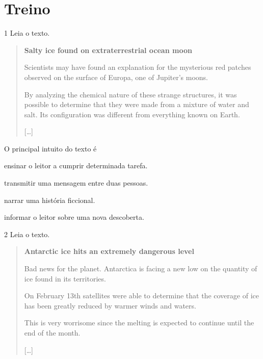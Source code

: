 
\section{Treino}

\num{1} Leia o texto.

\begin{quote}
\textbf{Salty ice found on extraterrestrial ocean moon}

Scientists may have found an explanation for the mysterious red patches observed on the surface of Europa, one of Jupiter’s moons.

By analyzing the chemical nature of these strange structures, it was possible to determine that they were made from a mixture of water and salt. Its configuration was different from everything known on Earth.

{[}\ldots{}{]}

\end{quote}


O principal intuito do texto é

\begin{escolha}
\item ensinar o leitor a cumprir determinada tarefa.

\item transmitir uma mensagem entre duas pessoas.

\item narrar uma história ficcional.

\item informar o leitor sobre uma nova descoberta.
\end{escolha}

\num{2} Leia o texto.

\begin{quote}
\textbf{Antarctic ice hits an extremely dangerous level}

Bad news for the planet. Antarctica is facing a new low on the quantity of ice found in its territories.

On February 13th satellites were able to determine that the coverage of ice has been greatly reduced by warmer winds and waters.

This is very worrisome since the melting is expected to continue until the end of the month.  

{[}\ldots{}{]}

\end{quote}

